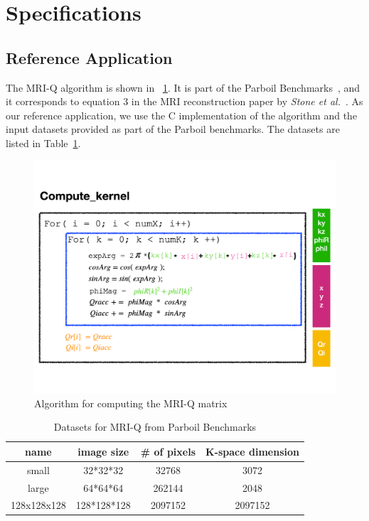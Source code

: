 \section{Specifications}

\subsection{Reference Application}

The MRI-Q algorithm is shown in \figurename~\ref{fig:algo}. It is part of the
Parboil Benchmarks~\cite{stratton2012parboil}, and it corresponds to equation 3
in the MRI reconstruction paper by \emph{Stone et
  al.}~\cite{stone2008accelerating}.
%
As our reference application, we use the C implementation of the algorithm and
the input datasets provided as part of the Parboil benchmarks. The datasets are
listed in Table~\ref{tab:datasets}.


\begin{figure}[t]
\centering
\includegraphics[width=\columnwidth]{figures/algorithm}
\caption{Algorithm for computing the MRI-Q matrix}
\label{fig:algo}
\end{figure}


\begin{table}[t]
\centering
\begin{tabular}{c|c|c|c}
\toprule
\textbf{name} & \textbf{image size} & \textbf{\# of pixels} & \textbf{K-space dimension} \\
\midrule
small       & 32*32*32    & 32768   & 3072    \\
large       & 64*64*64    & 262144  & 2048    \\
128x128x128 & 128*128*128 & 2097152 & 2097152 \\
\bottomrule
\end{tabular}
\caption{Datasets for MRI-Q from Parboil Benchmarks}
\label{tab:datasets}
\end{table}


